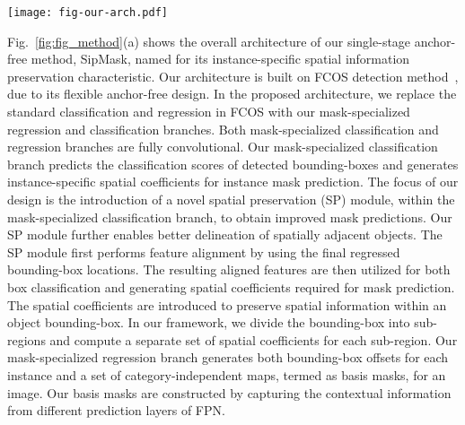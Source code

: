 \documentclass[runningheads]{llncs}
\begin{document}
\begin{figure*}[t!]
\centering
\texttt{[image: fig-our-arch.pdf]}\caption{(a) Overall architecture of our SipMask comprising fully convolutional mask-specialized classification (Sec.~\ref{sec:sp}) and regression (Sec.~\ref{sec:mbm}) branches. The focus of our design is the introduction of a novel spatial preservation (SP) module in the  mask-specialized classification branch. The SP module performs two-tasks: feature alignment and spatial coefficients generation. In our approach, a separate set of spatial coefficients are generated for each predicted bounding-box. These spatial coefficients are designed to preserve the spatial information within an object instance, thereby enabling improved  delineation  of spatially adjacent objects. The mask-specialized regression branch predicts both bounding-box offsets and a set of category-independent basis masks. The basis masks are generated by capturing contextual information from different prediction layers of FPN. (b) Both the basis masks and spatial coefficients along with predicted bounding-box locations are then input to our spatial mask prediction (SMP) module (Sec.~\ref{sec:smp}) for predicting the final instance mask.
} \label{fig:fig_method}
\end{figure*} 

 Fig.~\ref{fig:fig_method}(a) shows the overall architecture of our single-stage anchor-free method, SipMask, named for its instance-specific spatial information preservation characteristic. Our architecture is built on FCOS detection method~\cite{Tian_FCOS_ICCV_2019}, due to its flexible anchor-free design. In the proposed architecture, we replace the standard classification and regression in FCOS with our mask-specialized regression and classification branches. Both mask-specialized classification and regression branches are fully convolutional. Our mask-specialized classification branch predicts the classification scores of detected bounding-boxes and generates instance-specific spatial coefficients for instance mask prediction. The focus of our design is the introduction of a novel spatial preservation (SP) module, within the mask-specialized classification branch, to obtain improved mask predictions. Our SP module further enables better delineation of spatially adjacent objects. The SP module first performs feature alignment by using the final regressed bounding-box locations. The resulting aligned features are then utilized for both box classification and generating spatial coefficients required for mask prediction. The spatial coefficients are introduced to preserve spatial information within an object bounding-box. In our framework, we divide the bounding-box into  sub-regions and compute a separate set of spatial coefficients for each sub-region. Our mask-specialized regression branch generates both bounding-box offsets for each instance and a set of category-independent maps, termed as basis masks, for an image. Our basis masks are constructed by capturing the contextual information from different prediction layers of FPN.
\end{document}
